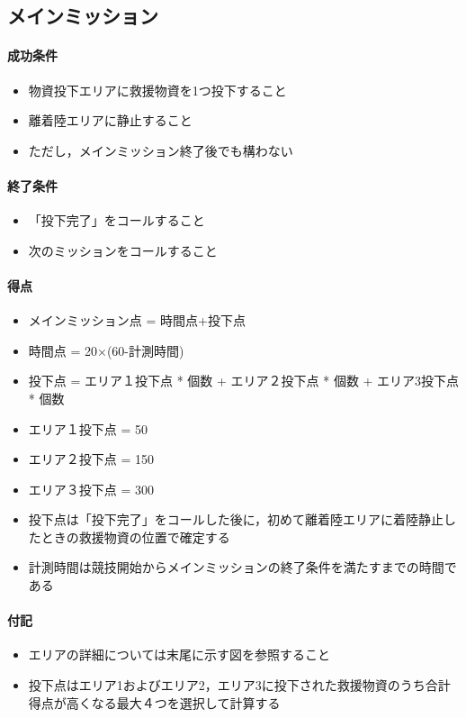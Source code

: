 
\subsection{メインミッション}
\paragraph{成功条件}
\begin{itemize}
\item 物資投下エリアに救援物資を1つ投下すること
\item 離着陸エリアに静止すること
  \item ただし，メインミッション終了後でも構わない
\end{itemize}
\paragraph{終了条件}
\begin{itemize}
\item 「投下完了」をコールすること
\item 次のミッションをコールすること
\end{itemize}
\paragraph{得点}
\begin{itemize}
\item メインミッション点 = 時間点+投下点
\item 時間点 = 20×(60-計測時間)
\item 投下点 = エリア１投下点 * 個数 + エリア２投下点 * 個数 + エリア3投下点 * 個数
\item エリア１投下点 = 50
\item エリア２投下点 = 150
\item エリア３投下点 = 300
\item 投下点は「投下完了」をコールした後に，初めて離着陸エリアに着陸静止したときの救援物資の位置で確定する
\item 計測時間は競技開始からメインミッションの終了条件を満たすまでの時間である
\end{itemize}
\paragraph{付記}
\begin{itemize}
\item エリアの詳細については末尾に示す図を参照すること
\item 投下点はエリア1およびエリア2，エリア3に投下された救援物資のうち合計得点が高くなる最大４つを選択して計算する
\end{itemize}

